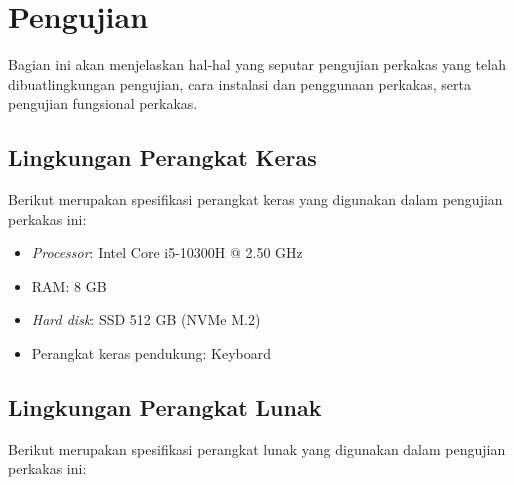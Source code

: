 \section{Pengujian}
\label{sec:testing-experiments}

Bagian ini akan menjelaskan hal-hal yang seputar pengujian perkakas yang telah dibuat\textemdash lingkungan pengujian, cara instalasi dan penggunaan perkakas, serta pengujian fungsional perkakas.

\subsection{Lingkungan Perangkat Keras}
\label{sec:testing-experiments-hardware}

Berikut merupakan spesifikasi perangkat keras yang digunakan dalam pengujian perkakas ini:

\begin{itemize}
	\item \textit{Processor}: Intel\logoregistered\xspace Core\logotrademark\xspace i5-10300H @ 2.50 GHz
	\item RAM: 8 GB
	\item \textit{Hard disk}: SSD 512 GB (NVMe\logotrademark\xspace M.2)
	\item Perangkat keras pendukung: Keyboard
\end{itemize}

\subsection{Lingkungan Perangkat Lunak}
\label{sec:testing-experiments-software}

Berikut merupakan spesifikasi perangkat lunak yang digunakan dalam pengujian perkakas ini:

